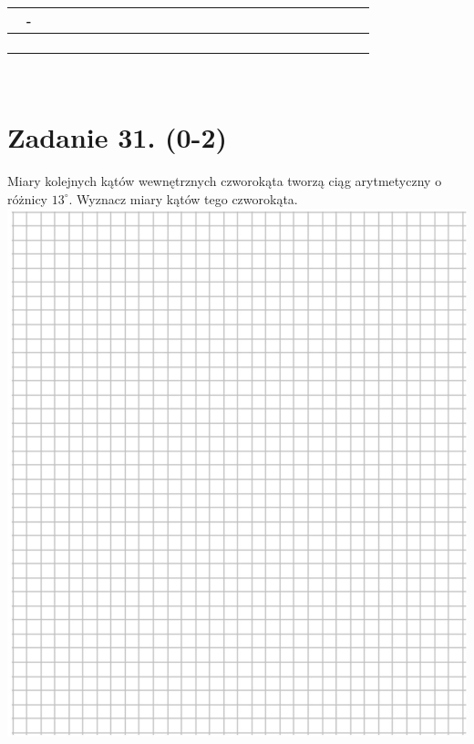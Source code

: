 \documentclass[10pt]{article}
\begin{document}
\begin{center}
\begin{tabular}{|c|c|c|c|c|c|c|c|c|c|c|c|c|c|c|c|c|c|c|c|c|c|c|c|c|c|c|c|}
\hline
 & - &  &  &  &  &  &  &  &  &  &  &  &  &  &  &  &  &  &  &  &  &  &  &  &  &  &  \\
\hline
 &  &  &  &  &  &  &  &  &  &  &  &  &  &  &  &  &  &  &  &  &  &  &  &  &  &  &  \\
\hline
 &  &  &  &  &  &  &  &  &  &  &  &  &  &  &  &  &  &  &  &  &  &  &  &  &  &  &  \\
\hline
 &  &  &  &  &  &  &  &  &  &  &  &  &  &  &  &  &  &  &  &  &  &  &  &  &  &  &  \\
\hline
 &  &  &  &  &  &  &  &  &  &  &  &  &  &  &  &  &  &  &  &  &  &  &  &  &  &  &  \\
\hline
\end{tabular}
\end{center}

\(\qquad\)

\section*{Zadanie 31. (0-2)}
Miary kolejnych kątów wewnętrznych czworokąta tworzą ciąg arytmetyczny o różnicy \(13^{\circ}\). Wyznacz miary kątów tego czworokąta.\\
\includegraphics[max width=\textwidth, center]{2024_11_21_ba65d61981011633d840g-15}
\end{document}
